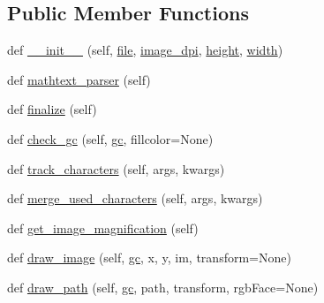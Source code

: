 \subsection*{Public Member Functions}
\begin{DoxyCompactItemize}
\item 
def \hyperlink{classmatplotlib_1_1backends_1_1backend__pdf_1_1RendererPdf_a80747eb9bebdb6ac1aa2bb9f29789cd6}{\+\_\+\+\_\+init\+\_\+\+\_\+} (self, \hyperlink{classmatplotlib_1_1backends_1_1backend__pdf_1_1RendererPdf_a2cbaecd443d5455df820f66516782d2d}{file}, \hyperlink{classmatplotlib_1_1backends_1_1backend__pdf_1_1RendererPdf_ac184449b4592d4fdf4455973c1932f5c}{image\+\_\+dpi}, \hyperlink{classmatplotlib_1_1backends_1_1__backend__pdf__ps_1_1RendererPDFPSBase_a131284b65ec191c070a364d1e1118555}{height}, \hyperlink{classmatplotlib_1_1backends_1_1__backend__pdf__ps_1_1RendererPDFPSBase_a55856d35dcfdf98307cb10fb3b1643ba}{width})
\item 
def \hyperlink{classmatplotlib_1_1backends_1_1backend__pdf_1_1RendererPdf_a0277fbe4acbc88c5184cb708768268e5}{mathtext\+\_\+parser} (self)
\item 
def \hyperlink{classmatplotlib_1_1backends_1_1backend__pdf_1_1RendererPdf_ab2ef41ab1bce46967710aa36930206bf}{finalize} (self)
\item 
def \hyperlink{classmatplotlib_1_1backends_1_1backend__pdf_1_1RendererPdf_ae7d9d8c96c11acffa1073431bd24909f}{check\+\_\+gc} (self, \hyperlink{classmatplotlib_1_1backends_1_1backend__pdf_1_1RendererPdf_a2cd9993f14dab9c29af6085a273257c1}{gc}, fillcolor=None)
\item 
def \hyperlink{classmatplotlib_1_1backends_1_1backend__pdf_1_1RendererPdf_a3e5974f6f9f2212d2ce1f9d33ca5c357}{track\+\_\+characters} (self, args, kwargs)
\item 
def \hyperlink{classmatplotlib_1_1backends_1_1backend__pdf_1_1RendererPdf_aaf55569cb19a25841a8b21b8571af15f}{merge\+\_\+used\+\_\+characters} (self, args, kwargs)
\item 
def \hyperlink{classmatplotlib_1_1backends_1_1backend__pdf_1_1RendererPdf_a8b90dbe028c92eb26d579426aa5813af}{get\+\_\+image\+\_\+magnification} (self)
\item 
def \hyperlink{classmatplotlib_1_1backends_1_1backend__pdf_1_1RendererPdf_af3a6c1fbe0db132034f0ce4779e8f8b3}{draw\+\_\+image} (self, \hyperlink{classmatplotlib_1_1backends_1_1backend__pdf_1_1RendererPdf_a2cd9993f14dab9c29af6085a273257c1}{gc}, x, y, im, transform=None)
\item 
def \hyperlink{classmatplotlib_1_1backends_1_1backend__pdf_1_1RendererPdf_aa35b31dda07d5d55f3cd5ad051432646}{draw\+\_\+path} (self, \hyperlink{classmatplotlib_1_1backends_1_1backend__pdf_1_1RendererPdf_a2cd9993f14dab9c29af6085a273257c1}{gc}, path, transform, rgb\+Face=None)

\end{DoxyCompactItemize}
